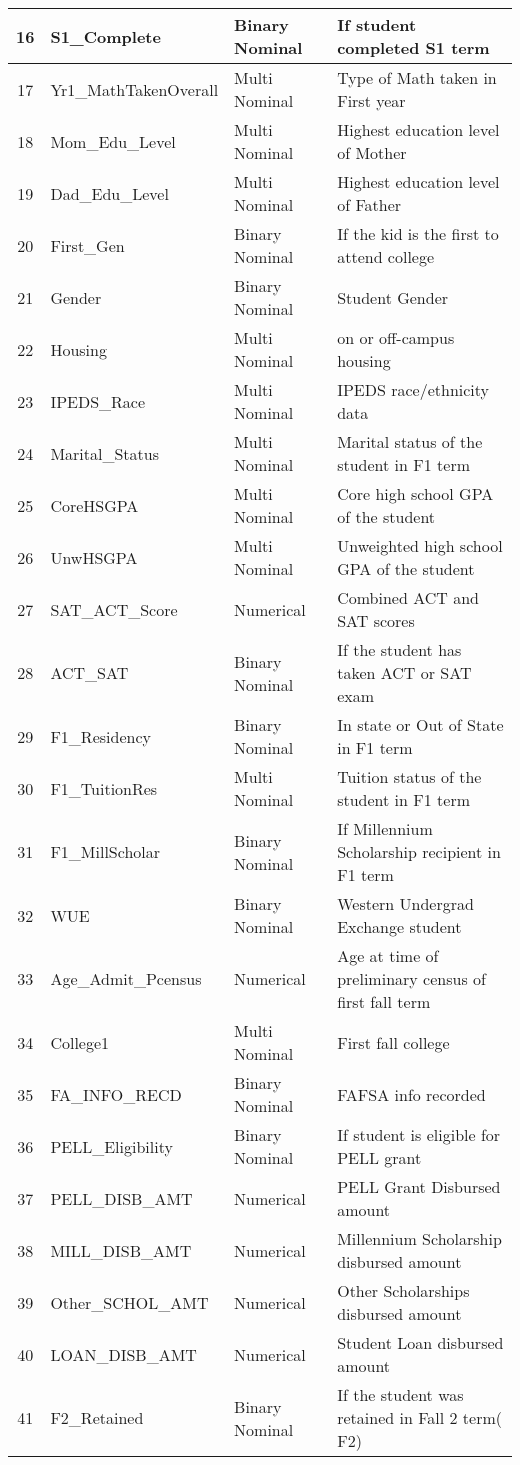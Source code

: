 \documentclass[11pt,openright]{report}
\begin{document}
\begin{longtable}{|c|l|l|l|}
		16 	&S1\_Complete		&	Binary	Nominal	&	If student completed S1 term			\\ \hline
		17	&Yr1\_MathTakenOverall & Multi Nominal		&	Type of Math taken in First year			\\ \hline
		18 	&Mom\_Edu\_Level		&	Multi Nominal		&	Highest education level of Mother		\\ \hline
		19 	&Dad\_Edu\_Level		&	Multi Nominal		&	Highest education level of Father			\\ \hline
		20 	&First\_Gen			&	Binary Nominal	&	If the kid is the first to attend college		\\ \hline
		21 	&Gender			&	Binary Nominal	&	Student Gender					\\ \hline
		22 	&Housing			&	Multi Nominal		&	on or off-campus housing				\\ \hline
		23 	&IPEDS\_Race		&	Multi Nominal		&	IPEDS race/ethnicity data				\\ \hline
		24 	&Marital\_Status		&	Multi Nominal		&	Marital status of the student in F1 term	\\ \hline
		25 	&CoreHSGPA			&	Multi Nominal		&	Core high school GPA of the student		\\ \hline
		26 	&UnwHSGPA			&	Multi Nominal		&	Unweighted high school GPA of the student	\\ \hline
		27 	&SAT\_ACT\_Score		&	Numerical		&	Combined ACT and SAT scores			\\ \hline
		28 	&ACT\_SAT			&	Binary Nominal	&	If the student has taken ACT or SAT exam	\\ \hline
		29 	&F1\_Residency		&	Binary Nominal	&	In state or Out of State in F1 term		\\ \hline
		30 	&F1\_TuitionRes		&	Multi Nominal		&	Tuition status of the student in F1 term \\ \hline
		31	&F1\_MillScholar		&	Binary Nominal		& 	If Millennium Scholarship recipient in F1 term  \\ \hline
		32	&WUE				&	Binary Nominal		&	Western Undergrad Exchange student  \\ \hline
		33	&Age\_Admit\_Pcensus	&	Numerical			&	Age at time of preliminary census of first fall term \\ \hline
		34	&College1				& Multi Nominal			& 	First fall college			\\ \hline
		35	&FA\_INFO\_RECD		&Binary Nominal		&	FAFSA info recorded		\\ \hline
		36	&PELL\_Eligibility		&Binary Nominal		&	If student is eligible for PELL grant \\ \hline
		37	&PELL\_DISB\_AMT &Numerical			&	PELL Grant Disbursed amount \\ \hline
		38	&MILL\_DISB\_AMT		& Numerical			&	Millennium Scholarship disbursed amount	  \\ \hline
		39	&Other\_SCHOL\_AMT & Numerical		&   	Other Scholarships disbursed amount \\ \hline
		40	&LOAN\_DISB\_AMT	&Numerical	&	Student Loan disbursed amount 	\\ \hline
		41	& F2\_Retained			&Binary Nominal &	If the student was retained in Fall 2 term( F2)

\end{longtable}
 
\end{document}
